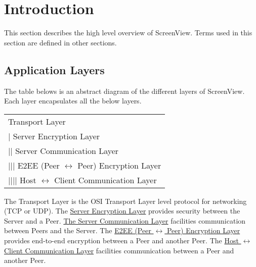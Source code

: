 \section{Introduction}

This section describes the high level overview of ScreenView. Terms used in this section are defined in other
sections.

\subsection{Application Layers}

The table belows is an abstract diagram of the different layers of ScreenView. Each layer encapsulates all the
below layers.

\begin{center}
    \begin{tabular}{|l|}
        \hline
        Transport Layer                                         \\
        | Server Encryption Layer                               \\
        || Server Communication Layer                           \\
        ||| E2EE (Peer $\leftrightarrow$ Peer) Encryption Layer \\
        |||| Host $\leftrightarrow$ Client Communication Layer  \\
        \hline
    \end{tabular}
\end{center}


The Transport Layer is the OSI Transport Layer level protocol for networking (TCP or UDP). The \hyperlink{section
.3}{Server
Encryption Layer} provides security between the Server and a Peer. \hyperlink{section.4}{The Server Communication
Layer} facilities communication between Peers and the Server. The \hyperlink{section.5}{E2EE (Peer
    $\leftrightarrow$ Peer) Encryption Layer} provides end-to-end encryption between a Peer and another Peer. The
\hyperlink{section.6}{Host $\leftrightarrow$ Client Communication Layer} facilities communication between a Peer and
another Peer.